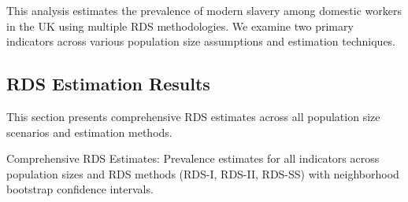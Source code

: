 \documentclass[
  12pt,
  letterpaper,
  DIV=11,
  numbers=noendperiod]{scrartcl}
\theoremstyle{plain}
\theoremstyle{definition}
\begin{document}
This analysis estimates the prevalence of modern slavery among domestic
workers in the UK using multiple RDS methodologies. We examine two
primary indicators across various population size assumptions and
estimation techniques.

\subsection{RDS Estimation Results}\label{rds-estimation-results}

This section presents comprehensive RDS estimates across all population
size scenarios and estimation methods.

\begin{table}

\caption{\label{tbl-rds-comprehensive}Comprehensive RDS Estimates:
Prevalence estimates for all indicators across population sizes and RDS
methods (RDS-I, RDS-II, RDS-SS) with neighborhood bootstrap confidence
intervals.}

\centering{

\begingroup\fontsize{7}{9}\selectfont

}
\end{table}
\end{document}
